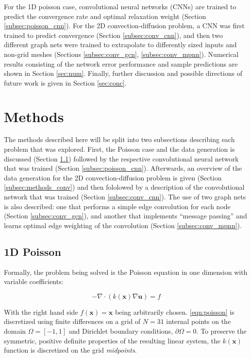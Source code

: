 \documentclass[review]{siamart190516}
\renewcommand{\vec}[1]{\bm{{#1}}}
\newcommand{\grad}{\nabla}
\begin{document}
For the 1D poisson case, convolutional neural networks (CNNs) are trained to predict the convergence rate and optimal relaxation weight (Section \ref{subsec:poisson_cnn}).  For the 2D convection-diffusion problem, a CNN was first trained to predict convergence (Section \ref{subsec:conv_cnn}), and then two different graph nets were trained to extrapolate to differently sized inputs and non-grid meshes (Sections \ref{subsec:conv_gcn}, \ref{subsec:conv_mpnn}).  Numerical results consisting of the network error performance and sample predictions are shown in Section \ref{sec:num}.  Finally, further discussion and possible directions of future work is given in Section \ref{sec:conc}.

\section{Methods}\label{sec:methods}

The methods described here will be split into two subsections describing each problem that was explored. First, the Poisson case and the data generation is discussed (Section \ref{subsec:methods_poisson}) followed by the respective convolutional neural network that was trained (Section \ref{subsec:poisson_cnn}).  Afterwards, an overview of the data generation for the 2D convection-diffusion problem is given (Section \ref{subsec:methods_conv}) and then fololowed by a description of the convolutional network that was trained (Section \ref{subsec:conv_cnn}).  The use of two graph nets is also described: one that performs a simple edge convolution for each node (Section \ref{subsec:conv_gcn}), and another that implements ``message passing'' and learns optimal edge weighting of the convolution (Section \ref{subsec:conv_mpnn}).

\subsection{1D Poisson}\label{subsec:methods_poisson}

Formally, the problem being solved is the Poisson equation in one dimension with variable coefficients:

\begin{equation} \label{eqn:poisson}
  -\grad \cdot \left(k\left(\vec{x}\right) \grad\vec{u}\right) = f
\end{equation}

With the right hand side $f\left(\vec{x}\right)=\vec{x}$ being arbitrarily chosen.  \ref{eqn:poisson} is discretized using finite differences on a grid of $N=31$ internal points on the domain $\Omega = \left[-1, 1\right]$ and Dirichlet boundary conditions, $\partial\Omega = 0$.  To preserve the symmetric, positive definite properties of the resulting linear system, the $k\left(\vec{x}\right)$ function is discretized on the grid \textit{midpoints}\cite{numpde}.
\end{document}
